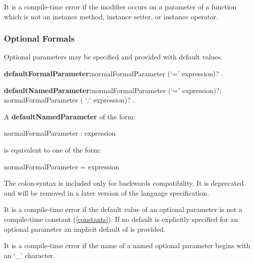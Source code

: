 \documentclass{article}
\begin{document}
\LMHash{}
It is a compile-time error if the modifier \COVARIANT{} occurs on a parameter of a function which is not an instance method, instance setter, or instance operator.


\subsubsection{Optional Formals}

\LMHash{}
Optional parameters may be specified and provided with default values.

\begin{grammar}
{\bf defaultFormalParameter:}normalFormalParameter (`=' expression)?
  .

{\bf defaultNamedParameter:}normalFormalParameter (`=' expression)?;
  normalFormalParameter ( `{\escapegrammar :}' expression)?
  .
\end{grammar}

A {\bf defaultNamedParameter} of the form:
\begin{code}
   normalFormalParameter : expression
\end{code}
is equivalent to one of the form:
\begin{code}
   normalFormalParameter = expression
\end{code}
The colon-syntax is included only for backwards compatibility.
It is deprecated and will be removed in a later version of the language specification.

\LMHash{}
It is a compile-time error if the default value of an optional parameter is not a compile-time constant (\ref{constants}).
If no default is explicitly specified for an optional parameter an implicit default of \NULL{} is provided.

\LMHash{}
It is a compile-time error if the name of a named optional parameter begins with an `\_' character.

\end{document}
